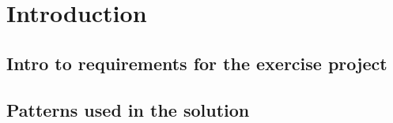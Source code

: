\chapter{Introduction}
\label{chp:intro}

\section{Intro to requirements for the exercise project}

\section{Patterns used in the solution}